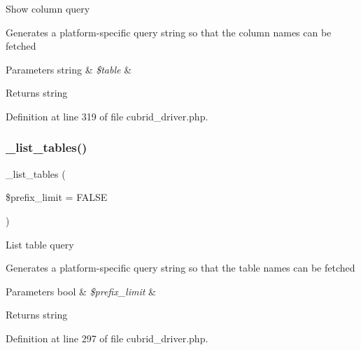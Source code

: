 Show column query

Generates a platform-\/specific query string so that the column names can be fetched


\begin{DoxyParams}[1]{Parameters}
string & {\em \$table} & \\
\hline
\end{DoxyParams}
\begin{DoxyReturn}{Returns}
string 
\end{DoxyReturn}


Definition at line 319 of file cubrid\+\_\+driver.\+php.

\mbox{\label{class_c_i___d_b__cubrid__driver_a435c0f3ce54fe7daa178baa8532ebd54}} 
\subsubsection{\texorpdfstring{\_list\_tables()}{\_list\_tables()}}
{\footnotesize\ttfamily \+\_\+list\+\_\+tables (\begin{DoxyParamCaption}\item[{}]{\$prefix\+\_\+limit = {\ttfamily FALSE} }\end{DoxyParamCaption})\hspace{0.3cm}{\ttfamily [protected]}}

List table query

Generates a platform-\/specific query string so that the table names can be fetched


\begin{DoxyParams}[1]{Parameters}
bool & {\em \$prefix\+\_\+limit} & \\
\hline
\end{DoxyParams}
\begin{DoxyReturn}{Returns}
string 
\end{DoxyReturn}


Definition at line 297 of file cubrid\+\_\+driver.\+php.

\mbox{\label{class_c_i___d_b__cubrid__driver_ac81ac882c1d54347d810199a15856aac}} 
